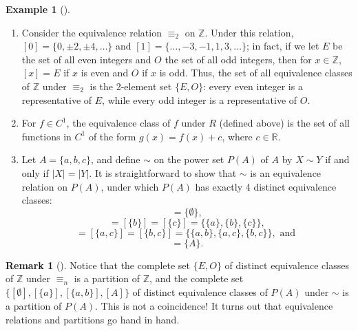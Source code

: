 \documentclass[10pt,]{book}
\theoremstyle{plain}
\theoremstyle{definition}
\theoremstyle{definition}
\newtheorem{remark}[theorem]{Remark}
\theoremstyle{definition}
\newtheorem{example}[theorem]{Example}
\theoremstyle{definition}
\numberwithin{equation}{section}
\def\Z{\mathbb{Z}}
\def\R{\mathbb{R}}
\begin{document}
\begin{example}[]\label{example-66}
\leavevmode%
\begin{enumerate}
\item\hypertarget{li-394}{}Consider the equivalence relation \(\equiv_2\) on \(\Z\).  Under this relation, \([0]=\{0,\pm 2, \pm 4, \ldots\}\) and \([1]=\{\ldots, -3, -1, 1, 3, \ldots\}\); in fact, if we let \(E\) be the set of all even integers and \(O\) the set of all odd integers, then for \(x\in \Z\), \([x]=E\) if \(x\) is even and \(O\) if \(x\) is odd. Thus, the set of all equivalence classes of \(\Z\) under \(\equiv_2\) is the 2-element set \(\{E,O\}\): every even integer is a representative of \(E\), while every odd integer is a representative of \(O\).%
\item\hypertarget{li-395}{}For \(f\in C^1\), the equivalence class of \(f\) under \(R\) (defined above) is the set of all functions in \(C^1\) of the form \(g(x)=f(x)+c\), where \(c\in \R\).%
\item\hypertarget{li-396}{}Let \(A=\{a,b,c\}\), and define \(\sim\) on the power set \(P(A)\) of \(A\) by \(X\sim Y\) if and only if \(|X|=|Y|\). It is straightforward to show that \(\sim\) is an equivalence relation on \(P(A)\), under which \(P(A)\) has exactly 4 distinct equivalence classes:%
\begin{equation*}
[\emptyset]=\{\emptyset\},
\end{equation*}
%
\begin{equation*}
[\{a\}]=[\{b\}]=[\{c\}]=\{\{a\},\{b\}, \{c\}\},
\end{equation*}
%
\begin{equation*}
[\{a,b\}]=[\{a,c\}]=[\{b,c\}]=\{\{a,b\},\{a,c\},\{b,c\}\}, \mbox{ and }
\end{equation*}
%
\begin{equation*}
[A]=\{A\}.
\end{equation*}
%
\end{enumerate}
\end{example}
\begin{remark}[]\label{remark-35}
Notice that the complete set \(\{E,O\}\) of distinct equivalence classes of \(\Z\) under \(\equiv_n\) is a partition of \(\Z\), and the complete set \(\{[\emptyset],[\{a\}],[\{a,b\}],[A]\}\) of distinct equivalence classes of \(P(A)\) under \(\sim\) is a partition of \(P(A)\). This is not a coincidence! It turns out that equivalence relations and partitions go hand in hand.%
\end{remark}
\end{document}
